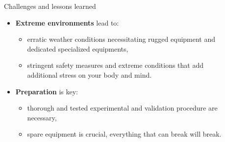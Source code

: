 \documentclass[final,hyperref={pdfpagelabels=false}]{beamer}
\begin{document}
\begin{frame}[t]
\begin{columns}[t]
\begin{column}{.465\textwidth}

\end{column} %

\begin{column}{.03\textwidth}\end{column} %
 
\begin{column}{.465\textwidth} %
	

\begin{block}{Challenges and lessons learned}
	\begin{itemize}
		\item \textbf{Extreme environments} lead to:
		\begin{itemize}
			\item erratic weather conditions necessitating rugged equipment and dedicated specialized equipments,
			\item stringent safety measures and extreme conditions that add additional stress on your body and mind.
		\end{itemize}
		\item \textbf{Preparation} is key:
		\begin{itemize}
			\item thorough and tested experimental and validation procedure are necessary,
			\item spare equipment is crucial, everything that can break will break.
		\end{itemize}
	\end{itemize}
\end{block}



\end{column}
\end{columns}
\end{frame}
\end{document}
